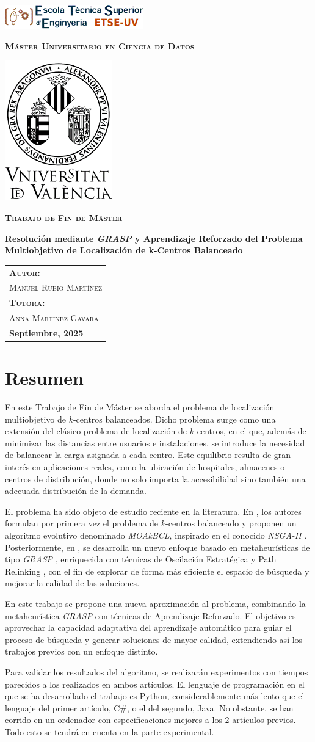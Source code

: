 \documentclass[12pt,a4paper]{book}
\newcommand{\nuevaportada}[6]{
    \thispagestyle{empty}
    \begin{center}
        \vfill 
        
        \includegraphics[width=0.45\textwidth]{images/logo.png}
        
        \vspace{0.5cm} %
        {\large\bfseries\textsc{M\'aster Universitario en #1}\par} %
        
        \vspace{0.5cm}
        \includegraphics[width=0.35\textwidth]{images/uv.png} %
        
        \vspace{0.5cm}
        {\large\bfseries\textsc{Trabajo de Fin de M\'aster}\par} %
        
        \vfill 
        
        {\LARGE\bfseries #2\par} %
        
        \vfill %
        
        \begin{flushright}
            \begin{tabular}{l} 
                {\large\bfseries\textsc{Autor:}} \\
                {\large\textsc{#3}} \\ [0.2cm] %
                {\large\bfseries\textsc{Tutora:}} \\ 
                {\large\textsc{#4}} \\ [0.2cm] %
                {\large\bfseries #5} 
            \end{tabular}
        \end{flushright}
        
        \vfill %
    \end{center}
}
\begin{document}
\nuevaportada{Ciencia de Datos}{Resolución mediante \textit{GRASP} y Aprendizaje Reforzado del Problema Multiobjetivo de Localización de k-Centros Balanceado }{Manuel Rubio Martínez}{Anna Martínez Gavara}{Septiembre, 2025}

\clearpage

\newpage
\tableofcontents

\newpage

\section*{Resumen}
En este Trabajo de Fin de Máster se aborda el problema de localización multiobjetivo de $k$-centros balanceados. Dicho problema surge como una extensión del clásico problema de localización de $k$-centros, en el que, además de minimizar las distancias entre usuarios e instalaciones, se introduce la necesidad de balancear la carga asignada a cada centro. Este equilibrio resulta de gran interés en aplicaciones reales, como la ubicación de hospitales, almacenes o centros de distribución, donde no solo importa la accesibilidad sino también una adecuada distribución de la demanda.

El problema ha sido objeto de estudio reciente en la literatura. En \cite{k-balanced_1}, los autores formulan por primera vez el problema de $k$-centros balanceado y proponen un algoritmo evolutivo denominado \textit{MOAkBCL}, inspirado en el conocido \textit{NSGA-II \citep{NSGA-II}}. Posteriormente, en \cite{k-Balanced_2}, se desarrolla un nuevo enfoque basado en metaheurísticas de tipo \textit{GRASP} \citep{GRASP}, enriquecida con técnicas de Oscilación Estratégica \citep{oscillation} y Path Relinking \citep{path_relinking}, con el fin de explorar de forma más eficiente el espacio de búsqueda y mejorar la calidad de las soluciones.

En este trabajo se propone una nueva aproximación al problema, combinando la metaheurística \textit{GRASP} con técnicas de Aprendizaje Reforzado. El objetivo es aprovechar la capacidad adaptativa del aprendizaje automático para guiar el proceso de búsqueda y generar soluciones de mayor calidad, extendiendo así los trabajos previos con un enfoque distinto. 

Para validar los resultados del algoritmo, se realizarán experimentos con tiempos parecidos a los realizados en ambos artículos. El lenguaje de programación en el que se ha desarrollado el trabajo es Python, considerablemente más lento que el lenguaje del primer artículo, C\#, o el del segundo, Java. No obstante, se han corrido en un ordenador con especificaciones mejores a los 2 artículos previos. Todo esto se tendrá en cuenta en la parte experimental.
\newpage
\end{document}

